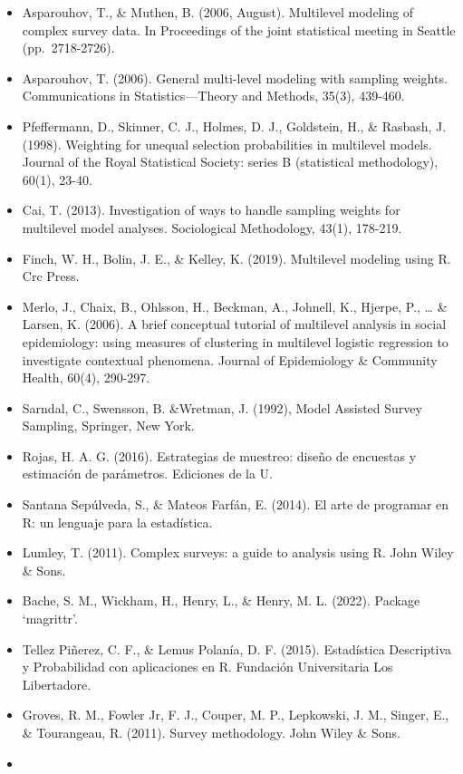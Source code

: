 \documentclass[
  spanish,
  12pt,
]{book}
\begin{document}
\begin{itemize}
\item
  Asparouhov, T., \& Muthen, B. (2006, August). Multilevel modeling of complex survey data. In Proceedings of the joint statistical meeting in Seattle (pp.~2718-2726).
\item
  Asparouhov, T. (2006). General multi-level modeling with sampling weights. Communications in Statistics---Theory and Methods, 35(3), 439-460.
\item
  Pfeffermann, D., Skinner, C. J., Holmes, D. J., Goldstein, H., \& Rasbash, J. (1998). Weighting for unequal selection probabilities in multilevel models. Journal of the Royal Statistical Society: series B (statistical methodology), 60(1), 23-40.
\item
  Cai, T. (2013). Investigation of ways to handle sampling weights for multilevel model analyses. Sociological Methodology, 43(1), 178-219.
\item
  Finch, W. H., Bolin, J. E., \& Kelley, K. (2019). Multilevel modeling using R. Crc Press.
\item
  Merlo, J., Chaix, B., Ohlsson, H., Beckman, A., Johnell, K., Hjerpe, P., \ldots{} \& Larsen, K. (2006). A brief conceptual tutorial of multilevel analysis in social epidemiology: using measures of clustering in multilevel logistic regression to investigate contextual phenomena. Journal of Epidemiology \& Community Health, 60(4), 290-297.
\item
  Sarndal, C., Swensson, B. \&Wretman, J. (1992), Model Assisted Survey Sampling, Springer, New York.
\item
  Rojas, H. A. G. (2016). Estrategias de muestreo: diseño de encuestas y estimación de parámetros. Ediciones de la U.
\item
  Santana Sepúlveda, S., \& Mateos Farfán, E. (2014). El arte de programar en R: un lenguaje para la estadística.
\item
  Lumley, T. (2011). Complex surveys: a guide to analysis using R. John Wiley \& Sons.
\item
  Bache, S. M., Wickham, H., Henry, L., \& Henry, M. L. (2022). Package `magrittr'.
\item
  Tellez Piñerez, C. F., \& Lemus Polanía, D. F. (2015). Estadística Descriptiva y Probabilidad con aplicaciones en R. Fundación Universitaria Los Libertadore.
\item
  Groves, R. M., Fowler Jr, F. J., Couper, M. P., Lepkowski, J. M., Singer, E., \& Tourangeau, R. (2011). Survey methodology. John Wiley \& Sons.
\item

\end{itemize}
\end{document}

